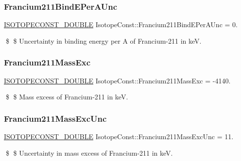 \subsubsection{\texorpdfstring{Francium211\+Bind\+E\+Per\+A\+Unc}{Francium211BindEPerAUnc}}
{\footnotesize\ttfamily \mbox{\hyperlink{group___isotope_const-_macros_ga8f45a7272ce02c0b4c65c44636ed719a}{I\+S\+O\+T\+O\+P\+E\+C\+O\+N\+S\+T\+\_\+\+D\+O\+U\+B\+LE}} Isotope\+Const\+::\+Francium211\+Bind\+E\+Per\+A\+Unc = 0.}

\$ \$ Uncertainty in binding energy per A of Francium-\/211 in keV. \mbox{\label{group___isotope_const-_francium-_fr211_ga122882f9692a9e9c36eeab6e32834b01}} 
\subsubsection{\texorpdfstring{Francium211\+Mass\+Exc}{Francium211MassExc}}
{\footnotesize\ttfamily \mbox{\hyperlink{group___isotope_const-_macros_ga8f45a7272ce02c0b4c65c44636ed719a}{I\+S\+O\+T\+O\+P\+E\+C\+O\+N\+S\+T\+\_\+\+D\+O\+U\+B\+LE}} Isotope\+Const\+::\+Francium211\+Mass\+Exc = -\/4140.}

\$ \$ Mass excess of Francium-\/211 in keV. \mbox{\label{group___isotope_const-_francium-_fr211_gaff4e9aabd655bba529809ee86287aff4}} 
\subsubsection{\texorpdfstring{Francium211\+Mass\+Exc\+Unc}{Francium211MassExcUnc}}
{\footnotesize\ttfamily \mbox{\hyperlink{group___isotope_const-_macros_ga8f45a7272ce02c0b4c65c44636ed719a}{I\+S\+O\+T\+O\+P\+E\+C\+O\+N\+S\+T\+\_\+\+D\+O\+U\+B\+LE}} Isotope\+Const\+::\+Francium211\+Mass\+Exc\+Unc = 11.}

\$ \$ Uncertainty in mass excess of Francium-\/211 in keV. \mbox{\label{group___isotope_const-_francium-_fr211_ga1cbc8b07aee1387d454ad7b48391496c}} 
